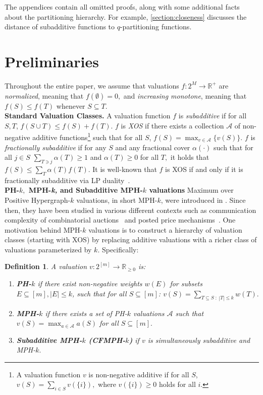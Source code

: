 \documentclass[11pt]{article}\usepackage{amsfonts}
\newtheorem{definition}[theorem]{Definition}
\numberwithin{theorem}{subsection}
\def\hmath$#1${\texorpdfstring{{\rmfamily\textit{#1}}}{#1}}
\begin{document}
The appendices contain all omitted proofs, along with some additional facts about the partitioning hierarchy. For example, \cref{section:closeness} discusses the distance of subadditive functions to $q$-partitioning functions.

\section{Preliminaries}\label{sec:prelim}
Throughout the entire paper, we assume that valuations
$f:2^M\longrightarrow \mathbb{R}^+$ are \textit{normalized}, meaning that $f(\emptyset) = 0,$ and \textit{increasing monotone}, meaning that $f(S)\le f(T)$ whenever $S\subseteq T.$\\

\noindent\textbf{Standard Valuation Classes.} A valuation function $f$ is \emph{subadditive} if for all $S,T$, $f(S \cup T) \leq f(S) + f(T)$. $f$ is \emph{XOS} if there exists a collection $\mathcal{A}$ of non-negative additive functions\footnote{A valuation function $v$ is non-negative additive if for all $S$, $v(S)=\sum_{ i \in S} v(\{i\}),$ where $v(\{i\})\geq 0$ holds for all $i.$} such that for all $S$, $f(S)=\max_{v\in \mathcal{A}}\{v(S)\}$. $f$ is \emph{fractionally subadditive} if for any $S$ and any fractional cover $\alpha(\cdot)$ such that for all $j \in S$ $\sum_{T\ni j} \alpha(T) \geq 1$ and $\alpha(T)\geq 0$ for all $T,$ it holds that $f(S) \leq \sum_{T} \alpha(T) f(T)$. It is well-known that $f$ is XOS if and only if it is fractionally subadditive via LP duality~\cite{Feige09}. \\



\noindent\textbf{PH-$k,$ MPH-\hmath$k,$ and Subadditive MPH-$k$ valuations}
Maximum over Positive Hypergraph-$k$ valuations, in short MPH-$k$, were introduced in \cite{FeigeFIILS15}. Since then, they have been studied in various different contexts such as communication complexity of combinatorial auctions~\cite{EzraFNTW19} and posted price mechanisms~\cite{FeldmanGL15}. One motivation behind MPH-$k$ valuations is to construct a hierarchy of valuation classes (starting with XOS) by replacing additive valuations with a richer class of valuations parameterized by $k$. Specifically:

\begin{definition}
A valuation $v:2^{[m]}\longrightarrow \mathbb{R}_{\ge 0}$ is:
\begin{enumerate}
    \item \textbf{PH-$k$} if there exist non-negative weights $w(E)$ for subsets $E\subseteq [m], |E| \leq k$, such that for all $S\subseteq [m]$: $\displaystyle v(S) = \sum_{T\subseteq S\; : \; |T|\le k} w(T).$
    \item \textbf{MPH-$k$} if there exists a set of PH-$k$ valuations $\mathcal{A}$ such that $\displaystyle v(S) = \max_{a\in \mathcal{A}} a(S)$ for all $S\subseteq[m].$
    \item \textbf{Subadditive MPH-$k$ (CFMPH-$k$)} if $v$ is simultaneously subadditive and MPH-$k.$ 
\end{enumerate}
\end{definition}
\end{document}
